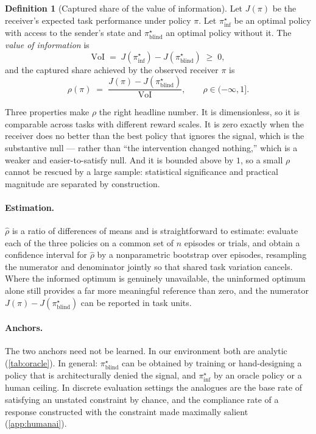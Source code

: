 \documentclass[11pt,a4paper]{article}
\theoremstyle{plain}
\theoremstyle{definition}
\newtheorem{definition}[definition]{Definition}
\theoremstyle{remark}
\begin{document}
\begin{definition}[Captured share of the value of information]\label{def:rho}
Let $J(\pi)$ be the receiver's expected task performance under policy $\pi$. Let
$\pi^{\star}_{\mathrm{inf}}$ be an optimal policy with access to the sender's state and
$\pi^{\star}_{\mathrm{blind}}$ an optimal policy without it. The \emph{value of information} is
\[
\mathrm{VoI} \;=\; J(\pi^{\star}_{\mathrm{inf}}) - J(\pi^{\star}_{\mathrm{blind}}) \;\ge\; 0,
\]
and the captured share achieved by the observed receiver $\pi$ is
\[
\rho(\pi) \;=\; \frac{J(\pi) - J(\pi^{\star}_{\mathrm{blind}})}{\mathrm{VoI}},
\qquad \rho \in (-\infty, 1].
\]
\end{definition}

Three properties make $\rho$ the right headline number. It is dimensionless, so it is comparable across
tasks with different reward scales. It is zero exactly when the receiver does no better than the best
policy that ignores the signal, which is the substantive null --- rather than ``the intervention changed
nothing,'' which is a weaker and easier-to-satisfy null. And it is bounded above by $1$, so a small
$\rho$ cannot be rescued by a large sample: statistical significance and practical magnitude are
separated by construction.

\paragraph{Estimation.}
$\hat{\rho}$ is a ratio of differences of means and is straightforward to estimate: evaluate each of the
three policies on a common set of $n$ episodes or trials, and obtain a confidence interval for
$\hat{\rho}$ by a nonparametric bootstrap over episodes, resampling the numerator and denominator jointly
so that shared task variation cancels. Where the informed optimum is genuinely unavailable, the
uninformed optimum alone still provides a far more meaningful reference than zero, and the numerator
$J(\pi) - J(\pi^{\star}_{\mathrm{blind}})$ can be reported in task units.

\paragraph{Anchors.}
The two anchors need not be learned. In our environment both are analytic (\cref{tab:oracle}). In
general: $\pi^{\star}_{\mathrm{blind}}$ can be obtained by training or hand-designing a policy that is
architecturally denied the signal, and $\pi^{\star}_{\mathrm{inf}}$ by an oracle policy or a human
ceiling. In discrete evaluation settings the analogues are the base rate of satisfying an unstated
constraint by chance, and the compliance rate of a response constructed with the constraint made
maximally salient (\cref{app:humanai}).
\end{document}
